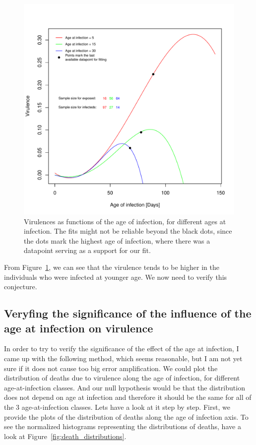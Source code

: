 \documentclass[10pt]{article}         %
\begin{document}
\begin{figure}[ht!]
    \includegraphics[width=\textwidth]{Virulences_age_of_infection_structured_same_model_for_same_infection_status.pdf}
    \caption{Virulences as functions of the age of infection, for different ages at infection. The fits might not be reliable beyond the black dots, since the dots mark the highest age of infection, where there was a datapoint serving as a support for our fit.}
\label{fig:virulence}
\end{figure}

From Figure~\ref{fig:virulence}, we can see that the virulence tends to be higher in the individuals who were infected at younger age. We now need to verify this conjecture.
\FloatBarrier
\subsection{Veryfing the significance of the influence of the age at infection on virulence}

In order to try to verify the significance of the effect of the age at infection, I came up with the following method, which seems reasonable, but I am not yet sure if it does not cause too big error amplification. We could plot the distribution of deaths due to virulence along the age of infection, for different age-at-infection classes. And our null hypothesis would be that the distribution does not depend on age at infection and therefore it should be the same for all of the 3 age-at-infection classes.
\newline\newline
Lets have a look at it step by step. First, we provide the plots of the distribution of deaths along the age of infection axis. To see the normalized histograms representing the distributions of deaths, have a look at Figure~\ref{fig:death_distributions}.
\end{document}
